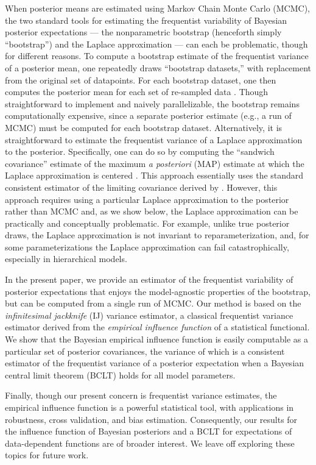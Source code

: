 When posterior means are estimated using Markov Chain Monte Carlo (MCMC), the
two standard tools for estimating the frequentist variability of Bayesian
posterior expectations --- the nonparametric bootstrap  (henceforth simply
``bootstrap'') and the Laplace approximation --- can each be problematic,
though for different reasons.
%
To compute a bootstrap estimate of
the frequentist variance of a posterior mean, one repeatedly draws ``bootstrap
datasets,'' with replacement from the original set of datapoints. For each
bootstrap dataset, one then computes the posterior mean for each set of
re-sampled data \citep{huggins:2022:bayesbag}.  Though straightforward to
implement and naively parallelizable, the bootstrap remains
computationally expensive, since a separate posterior estimate (e.g., a
run of MCMC) must be computed for each bootstrap dataset.
%
Alternatively, it is straightforward to estimate the frequentist variance of a
Laplace approximation to the posterior.   Specifically, one can do so by
computing the ``sandwich covariance'' estimate of the maximum \textit{a
posteriori} (MAP) estimate at which the Laplace approximation is centered
\citep{stefanski:2002:mestimation}.  This approach essentially uses the standard
consistent estimator of the limiting covariance derived by
\citet{kleijn:2012:bvm}.  However, this approach requires using a particular Laplace
approximation to the posterior rather than MCMC and, as we show below, the
Laplace approximation can be practically and conceptually problematic.  For
example, unlike true posterior draws, the Laplace approximation is not invariant
to reparameterization, and, for some parameterizations the Laplace approximation
can fail catastrophically, especially in hierarchical models.


In the present paper, we provide an estimator of the frequentist variability of
posterior expectations that enjoys the model-agnostic properties of the
bootstrap, but can be computed from a single run of MCMC. Our
method is based on the \emph{infinitesimal jackknife} (IJ) variance estimator, a
classical frequentist variance estimator derived from the \emph{empirical
influence function} of a statistical functional.  We show that the Bayesian
empirical influence function is easily computable as a particular set of
posterior covariances, the variance of which is a consistent estimator of the
frequentist variance of a posterior expectation when a Bayesian central limit
theorem (BCLT) holds for all model parameters.

Finally, though our present concern is frequentist variance estimates, the
empirical influence function is a powerful statistical tool, with applications
in robustness, cross validation, and bias estimation. Consequently, our results
for the influence function of Bayesian posteriors and a BCLT for expectations of
data-dependent functions are of broader interest.  We leave off exploring these
topics for future work.
